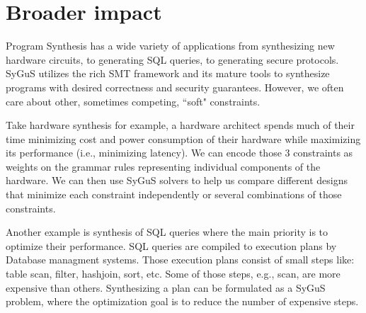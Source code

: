 \section{Broader impact}
\label{sec:impact}
Program Synthesis has a wide variety of applications from synthesizing new hardware circuits, to generating SQL queries, to generating secure protocols.
%
SyGuS utilizes the rich SMT framework and its mature tools to synthesize programs with desired correctness and security guarantees.
%
However, we often care about other, sometimes competing, ``soft" constraints.
%

Take hardware synthesis for example, a hardware architect spends much of their time minimizing cost and power consumption of their hardware while maximizing its performance (i.e., minimizing latency).
%
We can encode those 3 constraints as weights on the grammar rules representing individual components of the hardware.
%
We can then use SyGuS solvers to help us compare different designs that minimize each constraint independently or several combinations of those constraints.
%

Another example is synthesis of SQL queries where the main priority is to optimize their performance.
%
SQL queries are compiled to execution plans by Database managment systems.
%
Those execution plans consist of small steps like: table scan, filter, hashjoin, sort, etc.
%
Some of those steps, e.g., scan, are more expensive than others.
%
Synthesizing a plan can be formulated as a SyGuS problem, where the optimization goal is to reduce the number of expensive steps.



%
%
%
%

